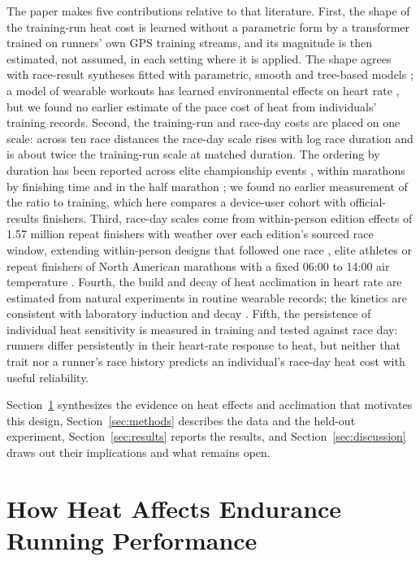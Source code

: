 \documentclass[11pt]{article}
\renewcommand{\_}{\textunderscore\allowbreak}
\begin{document}
The paper makes five contributions relative to that literature. First, the shape of the training-run heat cost is learned without a parametric form by a transformer trained on runners' own GPS training streams, and its magnitude is then estimated, not assumed, in each setting where it is applied. The shape agrees with race-result syntheses fitted with parametric, smooth and tree-based models \citep{ely2007, elhelou2012, knechtle2019, mantzios2022, yang2026}; a model of wearable workouts has learned environmental effects on heart rate \citep{nazaret2023}, but we found no earlier estimate of the pace cost of heat from individuals' training records. Second, the training-run and race-day costs are placed on one scale: across ten race distances the race-day scale rises with log race duration and is about twice the training-run scale at matched duration. The ordering by duration has been reported across elite championship events \citep{guy2014}, within marathons by finishing time \citep{ely2007, vihma2010, montain2007} and in the half marathon \citep{hodgson2022}; we found no earlier measurement of the ratio to training, which here compares a device-user cohort with official-results finishers. Third, race-day scales come from within-person edition effects of 1.57 million repeat finishers with weather over each edition's sourced race window, extending within-person designs that followed one race \citep{tan2022}, elite athletes \citep{wang2024} or repeat finishers of North American marathons with a fixed 06:00 to 14:00 air temperature \citep{oliveira2026}. Fourth, the build and decay of heat acclimation in heart rate are estimated from natural experiments in routine wearable records; the kinetics are consistent with laboratory induction and decay \citep{periard2015, flouris2014, daanen2018}. Fifth, the persistence of individual heat sensitivity is measured in training and tested against race day: runners differ persistently in their heart-rate response to heat, but neither that trait nor a runner's race history predicts an individual's race-day heat cost with useful reliability.

Section~\ref{sec:literature} synthesizes the evidence on heat effects and acclimation that motivates this design, Section~\ref{sec:methods} describes the data and the held-out experiment, Section~\ref{sec:results} reports the results, and Section~\ref{sec:discussion} draws out their implications and what remains open.

\section{How Heat Affects Endurance Running Performance}
\label{sec:literature}
\end{document}
